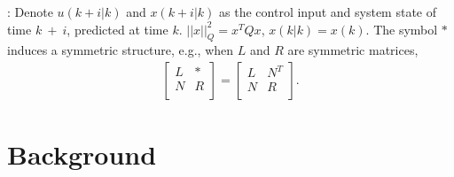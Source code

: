 \documentclass{singlecol-new}
\theoremstyle{TH}{
\newtheorem{lemma}{Lemma}
\newtheorem{theorem}[lemma]{Theorem}
\newtheorem{corrolary}[lemma]{Corrolary}
\newtheorem{conjecture}[lemma]{Conjecture}
\newtheorem{proposition}[lemma]{Proposition}
\newtheorem{claim}[lemma]{Claim}
\newtheorem{stheorem}[lemma]{Wrong Theorem}
\newtheorem{algorithm}{Algorithm}
}
\theoremstyle{THrm}{
\newtheorem{definition}{Definition}[section]
\newtheorem{question}{Question}[section]
\newtheorem{remark}{Remark}
\newtheorem{scheme}{Scheme}
}
\theoremstyle{THhit}{
\newtheorem{case}{Case}[section]
}
\begin{document}
: Denote $u(k + i|k)$ and $x(k + i|k)$ as the
control input and system state of time $k~+~i$, predicted at time
$k$. $||x||_Q^2 = x^T Qx$, $x(k|k) = x(k)$. The symbol $*$ induces
a symmetric structure, e.g., when $L$  and $R$ are symmetric
matrices,
\begin{eqnarray*}
\left[ {\begin{array}{cc}
   L &  *   \\
   N & R  \\
\end{array}} \right] = \left[ {\begin{array}{cc}
   L & {N^T }  \\
   N & R  \\
\end{array}}\right].
\end{eqnarray*}

\section{Background}
\end{document}
